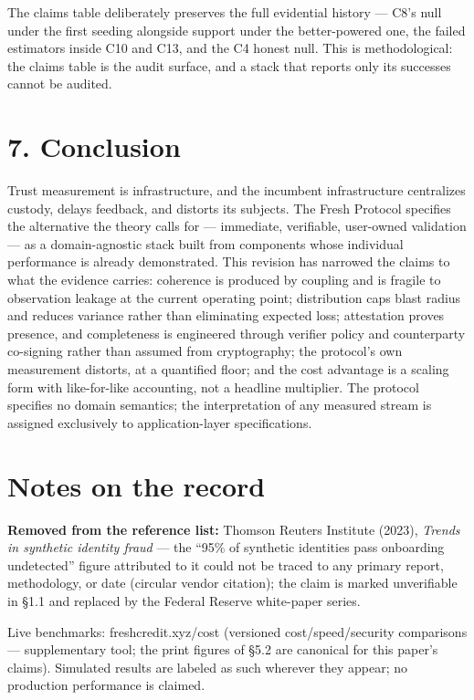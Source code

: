 \documentclass[
]{article}
\begin{document}
The claims table deliberately preserves the full evidential history ---
C8's null under the first seeding alongside support under the
better-powered one, the failed estimators inside C10 and C13, and the C4
honest null. This is methodological: the claims table is the audit
surface, and a stack that reports only its successes cannot be audited.

\section{7. Conclusion}\label{conclusion}

Trust measurement is infrastructure, and the incumbent infrastructure
centralizes custody, delays feedback, and distorts its subjects. The
Fresh Protocol specifies the alternative the theory calls for ---
immediate, verifiable, user-owned validation --- as a domain-agnostic
stack built from components whose individual performance is already
demonstrated. This revision has narrowed the claims to what the evidence
carries: coherence is produced by coupling and is fragile to observation
leakage at the current operating point; distribution caps blast radius
and reduces variance rather than eliminating expected loss; attestation
proves presence, and completeness is engineered through verifier policy
and counterparty co-signing rather than assumed from cryptography; the
protocol's own measurement distorts, at a quantified floor; and the cost
advantage is a scaling form with like-for-like accounting, not a
headline multiplier. The protocol specifies no domain semantics; the
interpretation of any measured stream is assigned exclusively to
application-layer specifications.

\section{Notes on the record}\label{notes-on-the-record}

\textbf{Removed from the reference list:} Thomson Reuters Institute
(2023), \emph{Trends in synthetic identity fraud} --- the ``95\% of
synthetic identities pass onboarding undetected'' figure attributed to
it could not be traced to any primary report, methodology, or date
(circular vendor citation); the claim is marked unverifiable in §1.1 and
replaced by the Federal Reserve white-paper series.

Live benchmarks: freshcredit.xyz/cost (versioned cost/speed/security
comparisons --- supplementary tool; the print figures of §5.2 are
canonical for this paper's claims). Simulated results are labeled as
such wherever they appear; no production performance is claimed.
\end{document}
